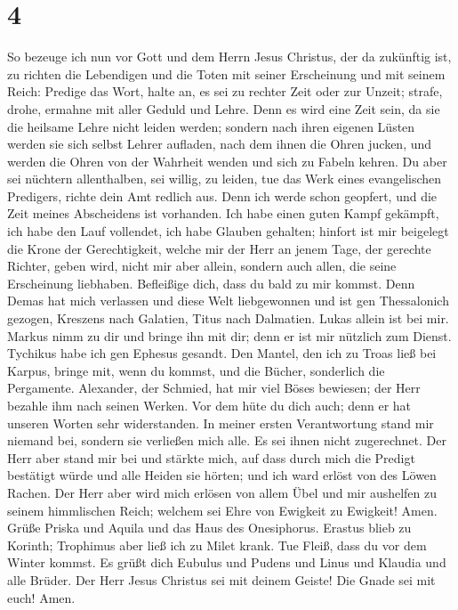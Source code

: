 \hypertarget{section-3}{%
\section{4}\label{section-3}}

 So bezeuge ich nun vor Gott und dem Herrn Jesus Christus,
der da zukünftig ist, zu richten die Lebendigen und die Toten mit seiner
Erscheinung und mit seinem Reich:  Predige das Wort, halte
an, es sei zu rechter Zeit oder zur Unzeit; strafe, drohe, ermahne mit
aller Geduld und Lehre.  Denn es wird eine Zeit sein, da
sie die heilsame Lehre nicht leiden werden; sondern nach ihren eigenen
Lüsten werden sie sich selbst Lehrer aufladen, nach dem ihnen die Ohren
jucken,  und werden die Ohren von der Wahrheit wenden und
sich zu Fabeln kehren.  Du aber sei nüchtern allenthalben,
sei willig, zu leiden, tue das Werk eines evangelischen Predigers,
richte dein Amt redlich aus.  Denn ich werde schon
geopfert, und die Zeit meines Abscheidens ist vorhanden. 
Ich habe einen guten Kampf gekämpft, ich habe den Lauf vollendet, ich
habe Glauben gehalten;  hinfort ist mir beigelegt die
Krone der Gerechtigkeit, welche mir der Herr an jenem Tage, der gerechte
Richter, geben wird, nicht mir aber allein, sondern auch allen, die
seine Erscheinung liebhaben.  Befleißige dich, dass du
bald zu mir kommst.  Denn Demas hat mich verlassen und
diese Welt liebgewonnen und ist gen Thessalonich gezogen, Kreszens nach
Galatien, Titus nach Dalmatien.  Lukas allein ist bei
mir. Markus nimm zu dir und bringe ihn mit dir; denn er ist mir nützlich
zum Dienst.  Tychikus habe ich gen Ephesus gesandt.
 Den Mantel, den ich zu Troas ließ bei Karpus, bringe
mit, wenn du kommst, und die Bücher, sonderlich die Pergamente.
 Alexander, der Schmied, hat mir viel Böses bewiesen; der
Herr bezahle ihm nach seinen Werken.  Vor dem hüte du
dich auch; denn er hat unseren Worten sehr widerstanden. 
In meiner ersten Verantwortung stand mir niemand bei, sondern sie
verließen mich alle. Es sei ihnen nicht zugerechnet.  Der
Herr aber stand mir bei und stärkte mich, auf dass durch mich die
Predigt bestätigt würde und alle Heiden sie hörten; und ich ward erlöst
von des Löwen Rachen.  Der Herr aber wird mich erlösen
von allem Übel und mir aushelfen zu seinem himmlischen Reich; welchem
sei Ehre von Ewigkeit zu Ewigkeit! Amen.  Grüße Priska
und Aquila und das Haus des Onesiphorus.  Erastus blieb
zu Korinth; Trophimus aber ließ ich zu Milet krank.  Tue
Fleiß, dass du vor dem Winter kommst. Es grüßt dich Eubulus und Pudens
und Linus und Klaudia und alle Brüder.  Der Herr Jesus
Christus sei mit deinem Geiste! Die Gnade sei mit euch! Amen.
